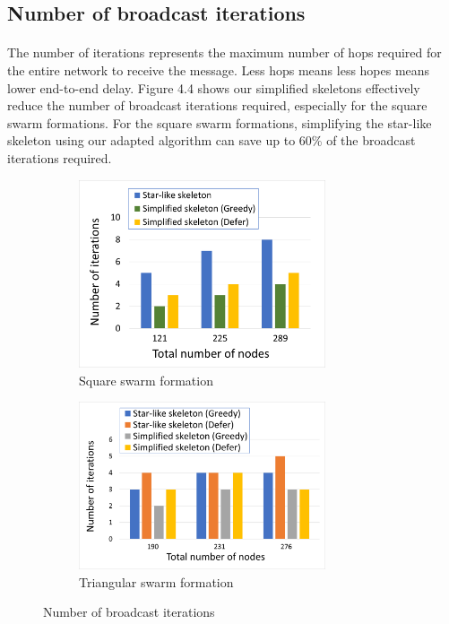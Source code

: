 \documentclass[a4paper,12pt]{report}
\begin{document}
\subsection{Number of broadcast iterations}
\paragraph{}
The number of iterations represents the maximum number of hops required for the entire network to receive the message. Less hops means less hopes means lower end-to-end delay. Figure 4.4 shows our simplified skeletons effectively reduce the number of broadcast iterations required, especially for the square swarm formations. For the square swarm formations, simplifying the star-like skeleton using our adapted algorithm can save up to 60\% of the broadcast iterations required.


\begin{figure}[tbph]
    \begin{subfigure}{1\linewidth}
    \centering
        \includegraphics[width=0.8\textwidth]{images/results_iterations_square.png}
        \caption{Square swarm formation}
    \end{subfigure}
    
    \vspace{1cm}
    \begin{subfigure}{1\linewidth}
    \centering
        \includegraphics[width=0.8\textwidth]{images/results_iterations_triangular.png}
        \caption{Triangular swarm formation}
    \end{subfigure}
\caption{Number of broadcast iterations}
\end{figure}
\end{document}
